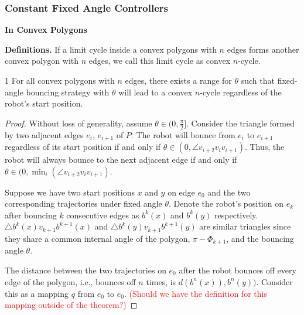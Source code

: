 \documentclass[]{styles/svproc}  %
\begin{document}
\subsubsection{Constant Fixed Angle Controllers}

\textbf{In Convex Polygons}

\textbf{Definitions.}
If a limit cycle inside a convex polygons with $n$ edges forms another convex polygon with $n$ edges, we call this limit cycle as convex $n$-cycle.

\begin{theorem} {1}
For all convex polygons with $n$ edges, there exists a range for $\theta$ such that fixed-angle bouncing strategy with $\theta$ will lead to a convex $n$-cycle regardless of the robot's start position.
\end{theorem}
\begin{proof}
Without loss of generality, assume $\theta \in (0, \frac{\pi}{2}]$. Consider the triangle formed by two adjacent edges $e_i$, $e_{i+1}$ of $P$. The robot will bounce from $e_i$ to $e_{i+1}$ regardless of its start position if and only if $\theta \in (0, \angle v_{i+2}v_{i}v_{i+1})$. Thus, the robot will always bounce to the next adjacent edge if and only if $\theta \in (0, \min_{i}(\angle v_{i+2}v_{i}v_{i+1})$.

Suppose we have two start positions $x$ and $y$ on edge $e_0$ and the two corresponding trajectories under fixed angle $\theta$. Denote the robot's position on $e_k$ after bouncing $k$ consecutive edges as $b^{k}(x)$ and $b^{k}(y)$ respectively. $\triangle b^{k}(x)v_{k+1}b^{k+1}(x)$ and $\triangle b^{k}(y)v_{k+1}b^{k+1}(y)$ are similar triangles since they share a common internal angle of the polygon, $\pi - \Phi_{k+1}$, and the bouncing angle $\theta$. 

The distance between the two trajectories on $e_0$ after the robot bounces off every edge of the polygon, i.e., bounces off $n$ times, is $d(b^{n}(x)), b^{n}(y))$. Consider this as a mapping $q$ from $e_0$ to $e_0$. \textcolor{red}{(Should we have the definition for this mapping outside of the theorem?)}


\end{proof}
\end{document}
